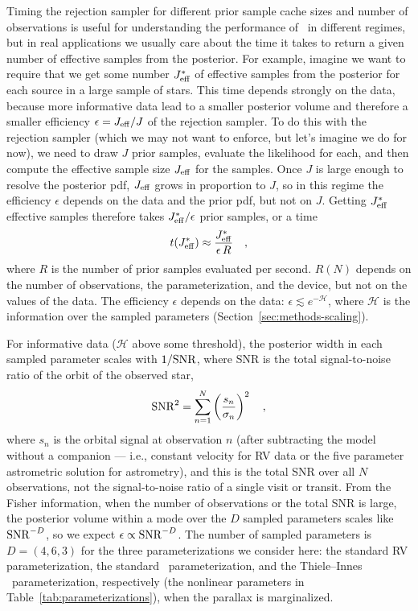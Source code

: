\documentclass[twocolumn]{AASTeX7/aastex701}
\newcommand{\harv}{\package{harv}}
\newcommand{\targESS}{\ensuremath{J_{\rm eff}^*}}
\begin{document}
Timing the rejection sampler for different prior sample cache sizes and number of
observations is useful for understanding the performance of \harv\ in different regimes,
but in real applications we usually care about the time it takes to return a given
number of effective samples from the posterior.
For example, imagine we want to require that we get some number $\targESS$ of effective
samples from the posterior for each source in a large sample of stars.
This time depends strongly on the data, because more informative data lead to a
smaller posterior volume and therefore a smaller efficiency $\epsilon = J_{\rm eff}/J$
of the rejection sampler.
To do this with the rejection sampler (which we may not want to enforce, but let's
imagine we do for now), we need to draw $J$ prior samples, evaluate the likelihood for
each, and then compute the effective sample size $J_{\rm eff}$ for the samples.
Once $J$ is large enough to resolve the posterior pdf, $J_{\rm eff}$ grows in proportion
to $J$, so in this regime the efficiency $\epsilon$ depends on the data and the prior
pdf, but not on $J$.
Getting $\targESS$ effective samples therefore takes $\targESS/\epsilon$ prior samples,
or a time
\begin{equation}
  t(\targESS) \approx \frac{\targESS}{\epsilon \, R}
  \quad ,
\end{equation}
where $R$ is the number of prior samples evaluated per second.
$R(N)$ depends on the number of observations, the parameterization, and the device, but
not on the values of the data.
The efficiency $\epsilon$ depends on the data: $\epsilon \lesssim e^{-\mathcal{H}}$,
where $\mathcal{H}$ is the information over the sampled parameters
(Section~\ref{sec:methods-scaling}).

For informative data ($\mathcal{H}$ above some threshold), the posterior width in each
sampled parameter scales with $1/{\rm SNR}$, where SNR is the total signal-to-noise
ratio of the orbit of the observed star,
\begin{equation}
  {\rm SNR}^2 = \sum_{n=1}^{N} \left(\frac{s_n}{\sigma_n}\right)^2
  \quad ,
\end{equation}
where $s_n$ is the orbital signal at observation $n$ (after subtracting the model
without a companion --- i.e., constant velocity for RV data or the five parameter
astrometric solution for astrometry), and this is the total SNR over all $N$
observations, not the signal-to-noise ratio of a single visit or transit.
From the Fisher information, when the number of observations or the total SNR is large,
the posterior volume within a mode over the $D$ sampled parameters scales like ${\rm
SNR}^{-D}$, so we expect $\epsilon \propto {\rm SNR}^{-D}$.
The number of sampled parameters is $D = (4, 6, 3)$ for the three parameterizations we
consider here: the standard RV parameterization, the standard \gaia\ parameterization,
and the Thiele--Innes \gaia\ parameterization, respectively (the nonlinear parameters in
Table~\ref{tab:parameterizations}), when the parallax is marginalized.
\end{document}
